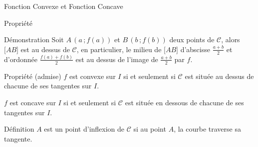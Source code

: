 \documentclass{coursbook}
\begin{document}
\begin{Gpartie}{Fonction Convexe et Fonction Concave}
\begin{Spartie}{Propriété}
\begin{SSpartie}{Démonstration}
                Soit $A\,\left(a\,; f(a)\right)$ et $B\,\left(b\,; f(b)\right)$ deux points de $\mathcal{C}$, alors $\big[AB\big]$ est au dessus de $\mathcal{C}$, en particulier, le milieu de $\big[AB\big]$ d'abscisse $\frac{a+b}{2}$ et d'ordonnée $\frac{f(a)+f(b)}{2}$ est au dessus de l'image de $\frac{a+b}{2}$ par $f$.
            \end{SSpartie}
        \end{Spartie}
        \begin{Spartie}{Propriété (admise)} 
            $f$ est convexe sur $I$ si et seulement si $\mathcal{C}$ est située au dessus de chacune de ses tangentes sur $I$.

            $f$ est concave sur $I$ si et seulement si $\mathcal{C}$ est située en dessous de chacune de ses tangentes sur $I$.

            \vfill
            \begin{center}
                \hspace{1cm}
                \parbox{\linewidth}{}
            \end{center}
        \end{Spartie}
        \vfill
        \pagebreak
        \begin{Spartie}{Définition} 
            $A$ est un point d'inflexion de $\mathcal{C}$ si au point $A$, la courbe traverse sa tangente.


\end{Spartie}
\end{Gpartie}
\end{document}
